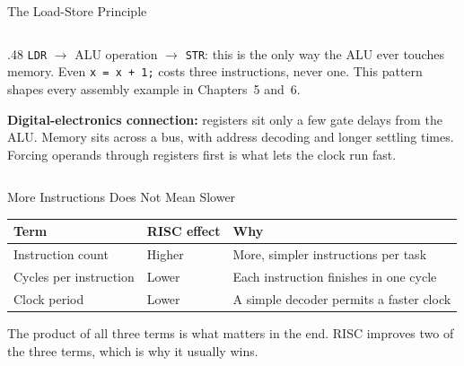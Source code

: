 \documentclass[9pt,aspectratio=169,xcolor=table]{beamer}
\newcommand{\striped}{\rowcolors{1}{white}{stripe}}
\begin{document}
\begin{frame}{The Load-Store Principle}
\begin{columns}[c]
\begin{column}{.48\textwidth}
        \vspace{3mm}
        {\small \texttt{LDR} $\to$ ALU operation $\to$ \texttt{STR}: this is the \alert{only} way the ALU ever touches memory. Even \texttt{x = x + 1;} costs \alert{three} instructions, never one. This pattern shapes every assembly example in Chapters~5 and~6.}

        \vspace{3mm}
        {\small \textbf{Digital-electronics connection:} registers sit only a few gate delays from the ALU. Memory sits across a bus, with address decoding and longer settling times. Forcing operands through registers first is what lets the clock run fast.}
    \end{column}
    \end{columns}
\end{frame}
\begin{frame}{More Instructions Does Not Mean Slower}
    \begin{center}
    \end{center}
    \vspace{4mm}
    \begin{center}
    {\small
    \striped
    \begin{tabular}{@{}l l l@{}}
        \toprule
        \textbf{Term} & \textbf{RISC effect} & \textbf{Why} \\
        \midrule
        Instruction count & \alert{Higher} & More, simpler instructions per task \\
        Cycles per instruction & \alert{Lower} & Each instruction finishes in one cycle \\
        Clock period & \alert{Lower} & A simple decoder permits a faster clock \\
        \bottomrule
    \end{tabular}}
    \end{center}
    \vspace{3mm}
    {\small The product of all three terms is what matters in the end. RISC improves two of the three terms, which is why it usually wins.}
\end{frame}
\end{document}
